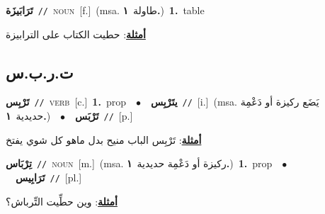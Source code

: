 \documentclass[10pt,a4paper,twoside]{article} %
\begin{document}
\begin{multicols}{2}
{{{{{\setlength\topsep{0pt}\textbf{\foreignlanguage{arabic}{تَرَابَيزَة}}\ {\color{gray}\texttt{//}\color{black}}\ \textsc{noun}\ [f.]\ \color{gray}(msa. \foreignlanguage{arabic}{طاولة}~\foreignlanguage{arabic}{\textbf{١.}})\color{black}\ \textbf{1.}~table\  \begin{flushright}\color{gray}\foreignlanguage{arabic}{\textbf{\underline{\foreignlanguage{arabic}{أمثلة}}}: حطيت الكتاب على الترابيزة}\end{flushright}\color{black}} \vspace{2mm}

\vspace{-3mm}
\subsection*{\color{blue}\foreignlanguage{arabic}{ت.ر.ب.س}\color{blue}{ (ntws)}} 

{\setlength\topsep{0pt}\textbf{\foreignlanguage{arabic}{تَرْبِس}}\ {\color{gray}\texttt{//}\color{black}}\ \textsc{verb}\ [c.]\ \textbf{1.}~prop\ \ $\bullet$\ \ \setlength\topsep{0pt}\textbf{\foreignlanguage{arabic}{يتَرْبِس}}\ {\color{gray}\texttt{//}\color{black}}\ [i.]\ \color{gray}(msa. \foreignlanguage{arabic}{يَضَع ركيزة أو دَعْمِة حديدية}~\foreignlanguage{arabic}{\textbf{١.}})\color{black}\ \ $\bullet$\ \ \setlength\topsep{0pt}\textbf{\foreignlanguage{arabic}{تَرْبَس}}\ {\color{gray}\texttt{//}\color{black}}\ [p.]\  \begin{flushright}\color{gray}\foreignlanguage{arabic}{\textbf{\underline{\foreignlanguage{arabic}{أمثلة}}}: تَرْبِس الباب منيح بدل ماهو كل شوي يفتخ}\end{flushright}\color{black}} \vspace{2mm}

{\setlength\topsep{0pt}\textbf{\foreignlanguage{arabic}{تِرْبَاس}}\ {\color{gray}\texttt{//}\color{black}}\ \textsc{noun}\ [m.]\ \color{gray}(msa. \foreignlanguage{arabic}{ركيزة أو دَعْمِة حديدية}~\foreignlanguage{arabic}{\textbf{١.}})\color{black}\ \textbf{1.}~prop\ \ $\bullet$\ \ \setlength\topsep{0pt}\textbf{\foreignlanguage{arabic}{تَرَابِيس}}\ {\color{gray}\texttt{//}\color{black}}\ [pl.]\  \begin{flushright}\color{gray}\foreignlanguage{arabic}{\textbf{\underline{\foreignlanguage{arabic}{أمثلة}}}: وين حطِّيت التِّرباش؟}\end{flushright}\color{black}} \vspace{2mm}

}}}}
\end{multicols}
\end{document}

